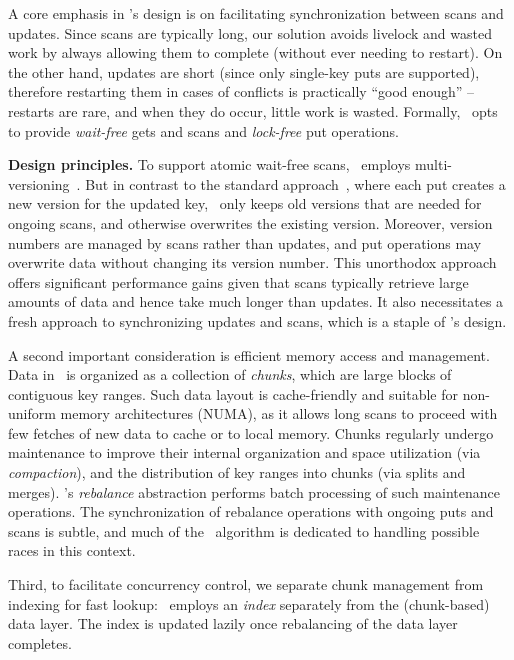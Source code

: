A core emphasis in \kiwi's design is on facilitating synchronization between 
scans and updates. Since scans are typically long, our solution avoids livelock 
and wasted work by always allowing them to complete (without ever needing to 
restart). On the other hand, updates are short (since only single-key puts are supported), 
therefore restarting them in cases of conflicts is practically ``good enough'' -- 
restarts are rare, and when they do occur, little work is wasted. 
Formally, \kiwi\  opts to provide \emph{wait-free} gets and scans and \emph{lock-free} put operations.


{\bf{Design principles.}}
To support atomic wait-free scans, \kiwi\ employs multi-versioning~\cite{BHG:Book87}. But in contrast to the standard approach~\cite{mv-stm-chapter}, where each put creates a new version for the updated key, \kiwi\ only keeps old versions that are needed for ongoing scans, and otherwise overwrites the existing version. Moreover, version numbers are managed by scans rather than updates, and put operations may
overwrite data without changing its version number. This unorthodox approach offers significant performance gains given that scans typically retrieve large amounts of data and hence take much longer than  updates.
It also necessitates a fresh approach to synchronizing updates and scans, which is a staple of \kiwi's design.

A second important consideration is efficient memory access and management. Data in \kiwi\ is organized
as a collection of {\em chunks}, which are large blocks of contiguous key ranges.
Such data layout is cache-friendly and suitable for non-uniform memory architectures (NUMA), as it
allows long scans to proceed with few fetches of new data to cache or to local memory.
Chunks regularly undergo maintenance to improve their internal organization and space utilization (via \emph{compaction}), and the distribution of key ranges into chunks (via splits and merges).
\kiwi's {\em rebalance\/} abstraction performs batch processing
of such maintenance operations. The synchronization of
rebalance operations with ongoing puts and scans is subtle, and much of the \kiwi\ algorithm is dedicated to handling
possible races in this context.

Third, to facilitate concurrency control, we separate chunk management from indexing for fast lookup:
\kiwi\ employs an \emph{index} separately from the (chunk-based) data layer.
The index is updated lazily once rebalancing of the data layer completes.

